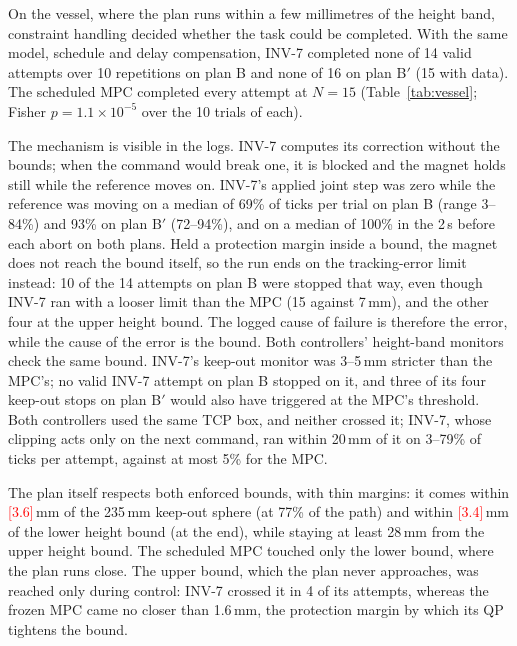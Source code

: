 \documentclass[journal]{IEEEtran}
\newcommand{\TBD}[1]{\textcolor{red}{[#1]}}
\begin{document}
On the vessel, where the plan runs within a few millimetres of the height
band, constraint handling decided whether the task could be completed.
With the same model, schedule and delay compensation, INV-7
completed none of 14 valid attempts over 10 repetitions on plan B and
none of 16 on plan B$'$ (15 with data). The scheduled MPC completed every attempt at
$N=15$ (Table~\ref{tab:vessel}; Fisher $p=1.1\times10^{-5}$ over the 10
trials of each).

The mechanism is visible in the logs. INV-7 computes its correction
without the bounds; when the command would break one, it is blocked and
the magnet holds still while the reference moves on. INV-7's applied
joint step was zero while the reference was moving on a median of 69\%
of ticks per trial on plan B (range 3--84\%) and 93\% on plan B$'$
(72--94\%), and on a median of 100\% in the 2\,s before each abort on
both plans. Held a
protection margin inside a bound, the magnet does not reach the bound
itself, so the run ends on the tracking-error limit instead: 10 of the 14
attempts on plan B were stopped that way, even though INV-7 ran with a
looser limit than the MPC (15 against 7\,mm), and the other four at the
upper height bound. The logged cause of failure is therefore the error,
while the cause of the error is the bound. Both controllers' height-band
monitors check the same bound. INV-7's keep-out monitor was 3--5\,mm
stricter than the MPC's; no valid INV-7 attempt on plan B stopped on it,
and three of its four keep-out stops on plan B$'$ would also have
triggered at the MPC's threshold.
Both controllers used the same TCP box, and neither crossed it; INV-7,
whose clipping acts only on the next command, ran within 20\,mm of it on
3--79\% of ticks per attempt, against at most 5\% for the MPC.


The plan itself respects both enforced bounds, with thin margins: it
comes within \TBD{3.6}\,mm of the 235\,mm keep-out sphere (at 77\% of the path)
and within \TBD{3.4}\,mm of the lower height bound (at the end), while staying
at least 28\,mm from the upper height bound. The scheduled MPC touched
only the lower bound, where the plan runs close. The upper bound, which
the plan never approaches, was reached only during control: INV-7 crossed
it in 4 of its attempts, whereas the frozen MPC came no closer than
1.6\,mm, the protection margin by which its QP tightens the bound.
\end{document}
